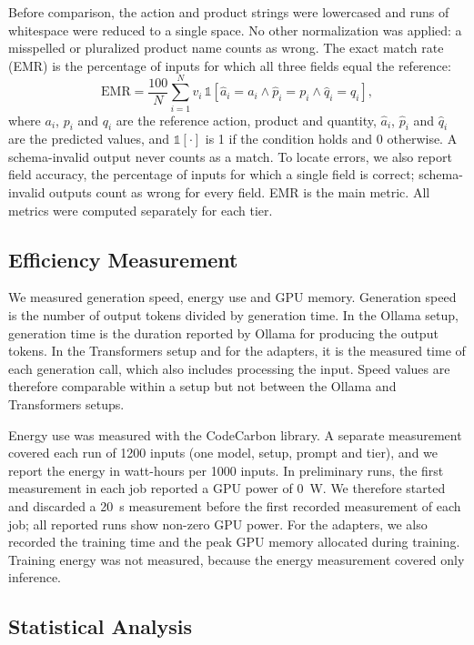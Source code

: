 \documentclass[journal,article,submit,pdftex,moreauthors]{Definitions/mdpi}
\begin{document}
Before comparison, the action and product strings were lowercased and runs of whitespace were reduced to a single space. No other normalization was applied: a misspelled or pluralized product name counts as wrong. The exact match rate (EMR) is the percentage of inputs for which all three fields equal the reference:
\begin{equation}
\mathrm{EMR} = \frac{100}{N} \sum_{i=1}^{N} v_i \, \mathbb{1}\!\left[\hat{a}_i = a_i \wedge \hat{p}_i = p_i \wedge \hat{q}_i = q_i\right],
\label{eq:emr}
\end{equation}
where $a_i$, $p_i$ and $q_i$ are the reference action, product and quantity, $\hat{a}_i$, $\hat{p}_i$ and $\hat{q}_i$ are the predicted values, and $\mathbb{1}[\cdot]$ is 1 if the condition holds and 0 otherwise. A schema-invalid output never counts as a match. To locate errors, we also report field accuracy, the percentage of inputs for which a single field is correct; schema-invalid outputs count as wrong for every field. EMR is the main metric. All metrics were computed separately for each tier.

\subsection{Efficiency Measurement}\label{sec:efficiency}

We measured generation speed, energy use and GPU memory. Generation speed is the number of output tokens divided by generation time. In the Ollama setup, generation time is the duration reported by Ollama for producing the output tokens. In the Transformers setup and for the adapters, it is the measured time of each generation call, which also includes processing the input. Speed values are therefore comparable within a setup but not between the Ollama and Transformers setups.

Energy use was measured with the CodeCarbon library. A separate measurement covered each run of 1200 inputs (one model, setup, prompt and tier), and we report the energy in watt-hours per 1000 inputs. In preliminary runs, the first measurement in each job reported a GPU power of 0~W. We therefore started and discarded a 20~s measurement before the first recorded measurement of each job; all reported runs show non-zero GPU power. For the adapters, we also recorded the training time and the peak GPU memory allocated during training. Training energy was not measured, because the energy measurement covered only inference.

\subsection{Statistical Analysis}\label{sec:stats}
\end{document}
